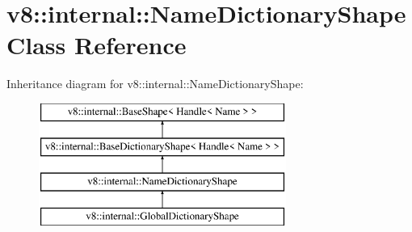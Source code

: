 \hypertarget{classv8_1_1internal_1_1_name_dictionary_shape}{}\section{v8\+:\+:internal\+:\+:Name\+Dictionary\+Shape Class Reference}
\label{classv8_1_1internal_1_1_name_dictionary_shape}
Inheritance diagram for v8\+:\+:internal\+:\+:Name\+Dictionary\+Shape\+:\begin{figure}[H]
\begin{center}
\leavevmode
\includegraphics[height=4.000000cm]{classv8_1_1internal_1_1_name_dictionary_shape}
\end{center}
\end{figure}

